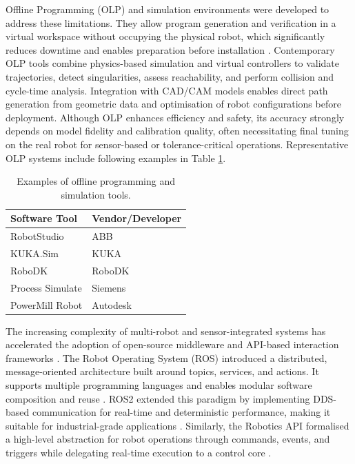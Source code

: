 Offline Programming (OLP) and simulation environments were developed to address these limitations. They allow program generation and verification in a virtual workspace without occupying the physical robot, which significantly reduces downtime and enables preparation before installation \cite{SicilianoKhatib2008}. Contemporary OLP tools combine physics-based simulation and virtual controllers to validate trajectories, detect singularities, assess reachability, and perform collision and cycle-time analysis. Integration with CAD/CAM models enables direct path generation from geometric data and optimisation of robot configurations before deployment. Although OLP enhances efficiency and safety, its accuracy strongly depends on model fidelity and calibration quality, often necessitating final tuning on the real robot for sensor-based or tolerance-critical operations. Representative OLP systems include following examples in Table \ref{tab:olp_tools}.

\begin{table}[H]
\centering
\begin{tabular}{l|l}
\textbf{Software Tool} & \textbf{Vendor/Developer} \\ \hline
RobotStudio           & ABB                         \\
KUKA.Sim             & KUKA                        \\
RoboDK               & RoboDK                      \\
Process Simulate      & Siemens                     \\
PowerMill Robot       & Autodesk                    \\
\end{tabular}
\caption{Examples of offline programming and simulation tools.}
\label{tab:olp_tools}
\end{table}

The increasing complexity of multi-robot and sensor-integrated systems has accelerated the adoption of open-source middleware and API-based interaction frameworks \cite{quigley2009ros}. The Robot Operating System (ROS) introduced a distributed, message-oriented architecture built around topics, services, and actions. It supports multiple programming languages and enables modular software composition and reuse \cite{quigley2009ros}. ROS2 extended this paradigm by implementing DDS-based communication for real-time and deterministic performance, making it suitable for industrial-grade applications \cite{hiillos2023design}. Similarly, the Robotics API formalised a high-level abstraction for robot operations through commands, events, and triggers while delegating real-time execution to a control core \cite{angerer2010robotics}.

